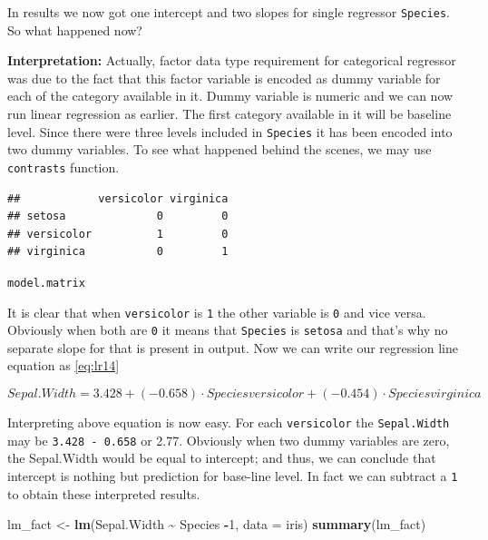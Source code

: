 \documentclass[
]{book}
\newenvironment{Shaded}{\begin{snugshade}}{\end{snugshade}}
\newcommand{\AttributeTok}[1]{\textcolor[rgb]{0.13,0.29,0.53}{#1}}
\newcommand{\DecValTok}[1]{\textcolor[rgb]{0.00,0.00,0.81}{#1}}
\newcommand{\FunctionTok}[1]{\textcolor[rgb]{0.13,0.29,0.53}{\textbf{#1}}}
\newcommand{\NormalTok}[1]{#1}
\newcommand{\OtherTok}[1]{\textcolor[rgb]{0.56,0.35,0.01}{#1}}
\newcommand{\SpecialCharTok}[1]{\textcolor[rgb]{0.81,0.36,0.00}{\textbf{#1}}}
\begin{document}
In results we now got one intercept and two slopes for single regressor \texttt{Species}. So what happened now?

\textbf{Interpretation:} Actually, factor data type requirement for categorical regressor was due to the fact that this factor variable is encoded as dummy variable for each of the category available in it. Dummy variable is numeric and we can now run linear regression as earlier. The first category available in it will be baseline level. Since there were three levels included in \texttt{Species} it has been encoded into two dummy variables. To see what happened behind the scenes, we may use \texttt{contrasts} function.

\begin{Shaded}
\end{Shaded}

\begin{verbatim}
##            versicolor virginica
## setosa              0         0
## versicolor          1         0
## virginica           0         1
\end{verbatim}

\texttt{model.matrix}

It is clear that when \texttt{versicolor} is \texttt{1} the other variable is \texttt{0} and vice versa. Obviously when both are \texttt{0} it means that \texttt{Species} is \texttt{setosa} and that's why no separate slope for that is present in output. Now we can write our regression line equation as \eqref{eq:lr14}

\begin{equation} 
{Sepal.Width} = 3.428 + (-0.658)\cdot{Speciesversicolor} + (-0.454)\cdot{Speciesvirginica}
\label{eq:lr14}
\end{equation}

Interpreting above equation is now easy. For each \texttt{versicolor} the \texttt{Sepal.Width} may be \texttt{3.428\ -\ 0.658} or 2.77. Obviously when two dummy variables are zero, the Sepal.Width would be equal to intercept; and thus, we can conclude that intercept is nothing but prediction for base-line level. In fact we can subtract a \texttt{1} to obtain these interpreted results.

\begin{Shaded}
\begin{Highlighting}[]
\NormalTok{lm\_fact }\OtherTok{\textless{}{-}} \FunctionTok{lm}\NormalTok{(Sepal.Width }\SpecialCharTok{\textasciitilde{}}\NormalTok{ Species }\SpecialCharTok{{-}}\DecValTok{1}\NormalTok{, }\AttributeTok{data =}\NormalTok{ iris)}
\FunctionTok{summary}\NormalTok{(lm\_fact)}
\end{Highlighting}
\end{Shaded}
\end{document}
